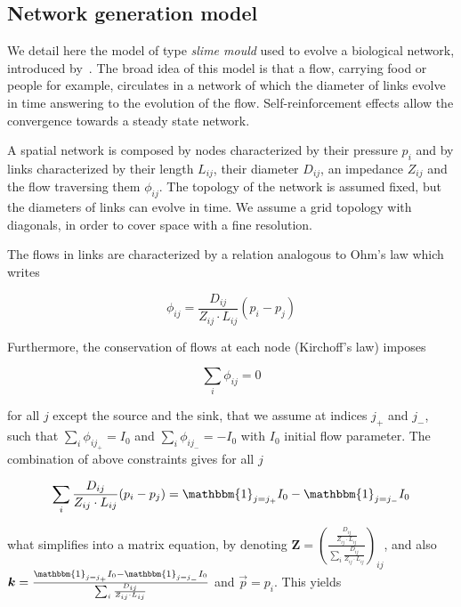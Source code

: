 \documentclass[runningheads,a4paper]{llncs}
\begin{document}
\subsection{Network generation model}


We detail here the model of type \emph{slime mould} used to evolve a biological network, introduced by~\cite{tero2007mathematical}. The broad idea of this model is that a flow, carrying food or people for example, circulates in a network of which the diameter of links evolve in time answering to the evolution of the flow. Self-reinforcement effects allow the convergence towards a steady state network.

A spatial network is composed by nodes characterized by their pressure $p_i$ and by links characterized by their length $L_{ij}$, their diameter $D_{ij}$, an impedance $Z_{ij}$ and the flow traversing them $\phi_{ij}$. The topology of the network is assumed fixed, but the diameters of links can evolve in time. We assume a grid topology with diagonals, in order to cover space with a fine resolution.

The flows in links are characterized by a relation analogous to Ohm's law which writes

\begin{equation}
\phi_{ij} = \frac{D_{ij}}{Z_{ij}\cdot L_{ij}} \left(p_i - p_j\right)
\end{equation}

Furthermore, the conservation of flows at each node (Kirchoff's law) imposes

\begin{equation}
\sum_i \phi_{ij} = 0
\end{equation}

for all $j$ except the source and the sink, that we assume at indices $j_+$ and $j_-$, such that $\sum_i \phi_{ij_+} = I_0$ and $\sum_i \phi_{ij_-} = -I_0$ with $I_0$ initial flow parameter. The combination of above constraints gives for all $j$

\begin{equation}
\sum_i \frac{D_{ij}}{Z_{ij}\cdot L_{ij}} (p_i - p_j) = \mathbbm{1}_{j=j_+} I_0 - \mathbbm{1}_{j=j_-} I_0 
\end{equation}

what simplifies into a matrix equation, by denoting $\mathbf{Z} = \left(\frac{\frac{D_{ij}}{Z_{ij}\cdot L_{ij}}}{\sum_i \frac{D_{ij}}{Z_{ij}\cdot L_{ij}}}\right)_{ij}$, and also $\vec{k} = \frac{\mathbbm{1}_{j=j_+} I_0 - \mathbbm{1}_{j=j_-} I_0 }{\sum_i \frac{D_{ij}}{Z_{ij}\cdot L_{ij}}}$ and $\vec{p} = p_i$. This yields
\end{document}
